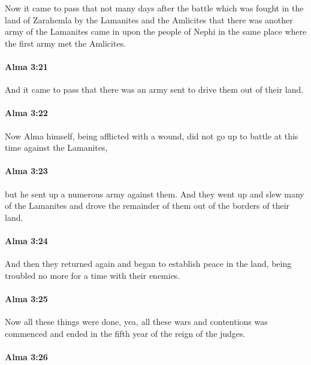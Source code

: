 			Now it came to pass that not many days after the battle
			which was fought in the land of Zarahemla by the Lamanites and the Amlicites
			that there was another army of the Lamanites came in upon the people of Nephi
			in the same place where the first army met the Amlicites.

		\paragraph{Alma 3:21} %
			\label{ALMA-3-21}

			And it came to pass that there was an army sent to drive them out of their land.

		\paragraph{Alma 3:22} %
			\label{ALMA-3-22}

			Now Alma himself, being afflicted with a wound,
			did not go up to battle at this time against the Lamanites,

		\paragraph{Alma 3:23} %
			\label{ALMA-3-23}

			but he sent up a numerous army against them.
			And they went up and slew many of the Lamanites
			and drove the remainder of them out of the borders of their land.

		\paragraph{Alma 3:24} %
			\label{ALMA-3-24}
	
			And then they returned again
			and began to establish peace in the land,
			being troubled no more for a time with their enemies.

		\paragraph{Alma 3:25} %
			\label{ALMA-3-25}

			Now all these things were done,
			yea, all these wars and contentions
			was commenced and ended in the fifth year of the reign of the judges.

		\paragraph{Alma 3:26} %
			\label{ALMA-3-26}

